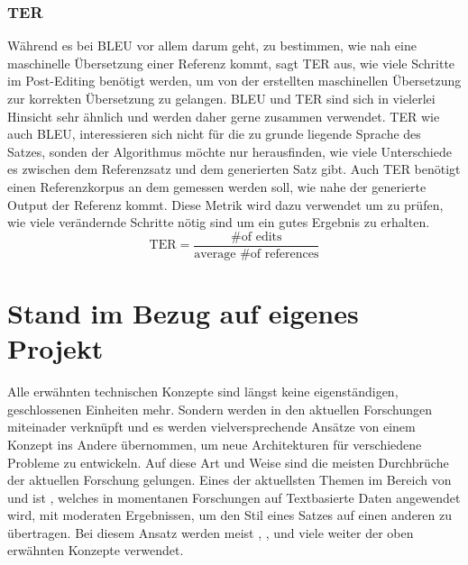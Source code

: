 \subsubsection{\gls{TER}}
\label{sub:TER}
Während es bei \gls{BLEU} vor allem darum geht, zu bestimmen, wie nah eine maschinelle Übersetzung einer Referenz kommt,
sagt \gls{TER} aus, wie viele Schritte im Post-Editing benötigt werden, um von der erstellten maschinellen Übersetzung
zur korrekten Übersetzung zu gelangen. \gls{BLEU} und \gls{TER} sind sich in vielerlei Hinsicht sehr ähnlich und werden
daher gerne zusammen verwendet.
\newline
\gls{TER} wie auch \gls{BLEU}, interessieren sich nicht für die zu grunde liegende Sprache des Satzes, sonden der
Algorithmus möchte nur herausfinden, wie viele Unterschiede es zwischen dem Referenzsatz und dem generierten Satz gibt.
\newline
Auch \gls{TER} benötigt einen Referenzkorpus an dem gemessen werden soll, wie nahe der generierte Output der Referenz
kommt.
\newline
Diese Metrik wird dazu verwendet um zu prüfen, wie viele verändernde Schritte nötig sind um ein gutes Ergebnis zu
erhalten.
\begin{equation}
	\text{TER} = \frac{\text{\# of edits}}{\text{average \# of references}}
\end{equation}

\section{Stand im Bezug auf eigenes Projekt}
\label{sec:stand-bezug-projekt}
Alle erwähnten technischen Konzepte sind längst keine eigenständigen, geschlossenen Einheiten mehr. Sondern werden in
den aktuellen Forschungen miteinader verknüpft und es werden vielversprechende Ansätze von einem Konzept ins Andere
übernommen, um neue Architekturen für verschiedene Probleme zu entwickeln. Auf diese Art und Weise sind die meisten
Durchbrüche der aktuellen Forschung gelungen.
\newline
\newline
Eines der aktuellsten Themen im Bereich von  und
 ist , welches in momentanen Forschungen auf
Textbasierte Daten angewendet wird, mit moderaten Ergebnissen, um den Stil eines Satzes auf einen anderen zu übertragen.
Bei diesem Ansatz werden meist , ,  und viele weiter der
oben erwähnten Konzepte verwendet.
